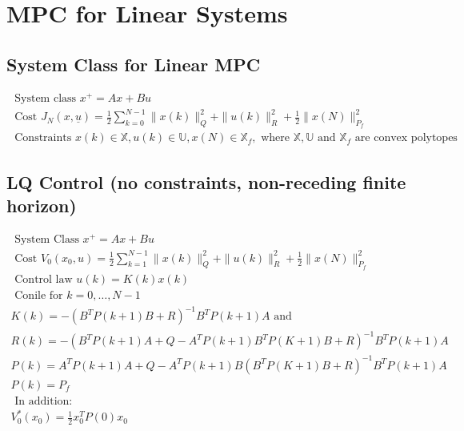 \documentclass[english]{latex4ei/latex4ei_sheet}
\begin{document}
\section{MPC for Linear Systems}
\begin{sectionbox}

\subsection{System Class for Linear MPC}
$$
\begin{array}{l}{\text { System class } x^{+}=A x+B u} \\ {\text { Cost } J_{N}(x, \underline{u})=\frac{1}{2} \sum_{k=0}^{N-1}\|x(k)\|_{Q}^{2}+\|u(k)\|_{R}^{2}+\frac{1}{2}\|x(N)\|_{P_{f}}^{2}} \\ {\text { Constraints } x(k) \in \mathbb{X}, u(k) \in \mathbb{U}, x(N) \in \mathbb{X}_{f}, \text { where } \mathbb{X}, \mathbb{U} \text { and } \mathbb{X}_{f} \text { are convex polytopes }}\end{array}
$$

\subsection{LQ Control (no constraints, non-receding finite horizon)}
$$
\begin{array}{l}{\text { System Class } x^{+}=A x+B u} \\ {\text { Cost } V_{0}\left(x_{0}, u\right)=\frac{1}{2} \sum_{k=1}^{N-1}\|x(k)\|_{Q}^{2}+\|u(k)\|_{R}^{2}+\frac{1}{2}\|x(N)\|_{P_{f}}^{2}} \\ {\text { Control law } u(k)=K(k) x(k)} \\ {\text { Conile for } k=0, \ldots, N-1} \\ {K(k)=-\left(B^{T} P(k+1) B+R\right)^{-1} B^{T} P(k+1) A \text { and }} \\ {R(k)=-\left(B^{T} P(k+1) A+Q-A^{T} P(k+1) B^{T} P(K+1) B+R\right)^{-1} B^{T} P(k+1) A} \\ {P(k)=A^{T} P(k+1) A+Q-A^{T} P(k+1) B\left(B^{T} P(K+1) B+R\right)^{-1} B^{T} P(k+1) A} \\ {P(k)=P_{f}} \\ {\text { In addition: }} \\ {V_{0}^{*}\left(x_{0}\right)=\frac{1}{2} x_{0}^{T} P(0) x_{0}}\end{array}
$$


\end{sectionbox}
\end{document}
